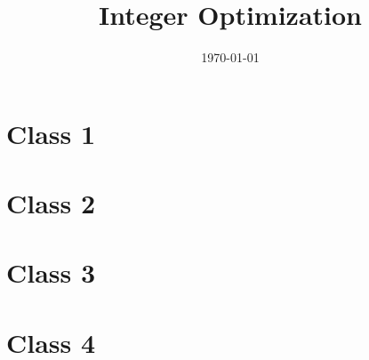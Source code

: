\documentclass[11pt, oneside, a4paper, openany]{book}
\title{Integer Optimization}
\date{\today}
\begin{document}
\maketitle
\frontmatter
\sloppy

\onehalfspacing  %

\begingroup
\let\cleardoublepage\clearpage
\tableofcontents
\endgroup

\mainmatter
{}

\chapter{Class 1}


\chapter{Class 2}


\chapter{Class 3}


\chapter{Class 4}

\end{document}

